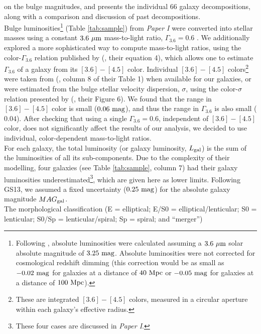 \documentclass[preprint2]{emulateapj}
\begin{document}
on the bulge magnitudes, and presents the individual 66 galaxy decompositions, 
along with a comparison and discussion of past decompositions. \\
Bulge luminosities\footnote{Following \cite{sani2011}, absolute luminosities were calculated 
assuming a $3.6\rm~\mu m$ solar absolute magnitude of $3.25\rm~mag$. 
Absolute luminosities were not corrected for cosmological redshift dimming 
(this correction would be as small as $-0.02\rm~mag$ for galaxies at a distance of $40\rm~Mpc$ 
or $-0.05\rm~mag$ for galaxies at a distance of $100\rm~Mpc$).} 
(Table \ref{tab:sample}) from \emph{Paper I} were converted into stellar masses 
using a constant $3.6\rm~\mu m$ mass-to-light ratio, $\Gamma_{3.6} = 0.6$ \citep{meidt2014}.
We additionally explored a more sophisticated way to compute mass-to-light ratios, 
using the color-$\Gamma_{3.6}$ relation published by 
\citeauthor{meidt2014} (\citeyear{meidt2014}, their equation 4), 
which allows one to estimate $\Gamma_{3.6}$ of a galaxy from its $[3.6] - [4.5]$ color. 
Individual $[3.6] - [4.5]$ colors\footnote{These are integrated $[3.6] - [4.5]$ colors, measured in a circular aperture 
within each galaxy's effective radius.} were taken from 
\citeauthor{peletier2012} (\citeyear{peletier2012}, column 8 of their Table 1) 
when available for our galaxies, 
or were estimated from the bulge stellar velocity dispersion, $\sigma$, 
using the color-$\sigma$ relation presented by \citeauthor{peletier2012} (\citeyear{peletier2012}, their Figure 6).
We found that the range in $[3.6] - [4.5]$ color is small ($0.06\rm~mag$), 
and thus the range in $\Gamma_{3.6}$ is also small ($0.04$).
After checking that using a single $\Gamma_{3.6} = 0.6$, independent of $[3.6] - [4.5]$ color, 
does not significantly affect the results of our analysis, 
we decided to use individual, color-dependent mass-to-light ratios. \\
For each galaxy, the total luminosity (or galaxy luminosity, $L_{\rm gal}$) is the sum of the luminosities of all its sub-components. 
Due to the complexity of their modelling, 
four galaxies (see Table \ref{tab:sample}, column 7) had their galaxy luminosities 
underestimated\footnote{These four cases are discussed in \emph{Paper I}.}, 
which are given here as lower limits. 
Following GS13, we assumed a fixed uncertainty ($0.25\rm~mag$) for the absolute galaxy magnitude $MAG_{\rm gal}$. \\
The morphological classification (E = elliptical; E/S0 = elliptical/lenticular; S0 = lenticular; S0/Sp = lenticular/spiral; Sp = spiral; and ``merger'') 
\end{document}

